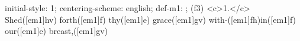 initial-style: 1;
centering-scheme: english;
def-m1: \grealign;
(f3) <c>1.</c> Shed([em1]hv) forth([em1]f) thy([em1]e) grace([em1]gv) with-([em1]fh)in([em1]f) our([em1]e) breast,([em1]gv)